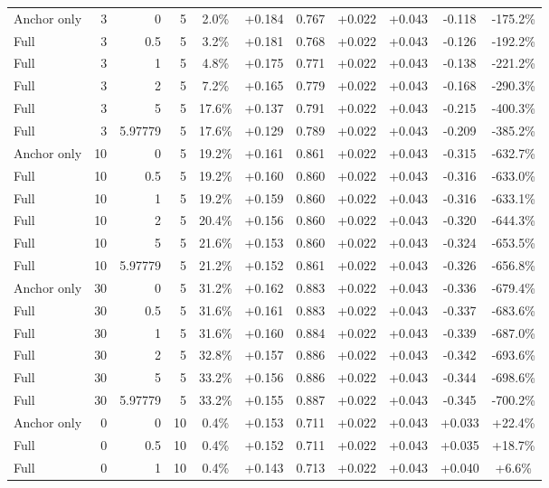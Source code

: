 \begin{table}[htbp]
\begin{tabular}{lrrrccccccc}
Anchor only & 3 & 0 & 5 & 2.0\% & +0.184 & 0.767 & +0.022 & +0.043 & -0.118 & -175.2\% \\
Full & 3 & 0.5 & 5 & 3.2\% & +0.181 & 0.768 & +0.022 & +0.043 & -0.126 & -192.2\% \\
Full & 3 & 1 & 5 & 4.8\% & +0.175 & 0.771 & +0.022 & +0.043 & -0.138 & -221.2\% \\
Full & 3 & 2 & 5 & 7.2\% & +0.165 & 0.779 & +0.022 & +0.043 & -0.168 & -290.3\% \\
Full & 3 & 5 & 5 & 17.6\% & +0.137 & 0.791 & +0.022 & +0.043 & -0.215 & -400.3\% \\
Full & 3 & 5.97779 & 5 & 17.6\% & +0.129 & 0.789 & +0.022 & +0.043 & -0.209 & -385.2\% \\
Anchor only & 10 & 0 & 5 & 19.2\% & +0.161 & 0.861 & +0.022 & +0.043 & -0.315 & -632.7\% \\
Full & 10 & 0.5 & 5 & 19.2\% & +0.160 & 0.860 & +0.022 & +0.043 & -0.316 & -633.0\% \\
Full & 10 & 1 & 5 & 19.2\% & +0.159 & 0.860 & +0.022 & +0.043 & -0.316 & -633.1\% \\
Full & 10 & 2 & 5 & 20.4\% & +0.156 & 0.860 & +0.022 & +0.043 & -0.320 & -644.3\% \\
Full & 10 & 5 & 5 & 21.6\% & +0.153 & 0.860 & +0.022 & +0.043 & -0.324 & -653.5\% \\
Full & 10 & 5.97779 & 5 & 21.2\% & +0.152 & 0.861 & +0.022 & +0.043 & -0.326 & -656.8\% \\
Anchor only & 30 & 0 & 5 & 31.2\% & +0.162 & 0.883 & +0.022 & +0.043 & -0.336 & -679.4\% \\
Full & 30 & 0.5 & 5 & 31.6\% & +0.161 & 0.883 & +0.022 & +0.043 & -0.337 & -683.6\% \\
Full & 30 & 1 & 5 & 31.6\% & +0.160 & 0.884 & +0.022 & +0.043 & -0.339 & -687.0\% \\
Full & 30 & 2 & 5 & 32.8\% & +0.157 & 0.886 & +0.022 & +0.043 & -0.342 & -693.6\% \\
Full & 30 & 5 & 5 & 33.2\% & +0.156 & 0.886 & +0.022 & +0.043 & -0.344 & -698.6\% \\
Full & 30 & 5.97779 & 5 & 33.2\% & +0.155 & 0.887 & +0.022 & +0.043 & -0.345 & -700.2\% \\
Anchor only & 0 & 0 & 10 & 0.4\% & +0.153 & 0.711 & +0.022 & +0.043 & +0.033 & +22.4\% \\
Full & 0 & 0.5 & 10 & 0.4\% & +0.152 & 0.711 & +0.022 & +0.043 & +0.035 & +18.7\% \\
Full & 0 & 1 & 10 & 0.4\% & +0.143 & 0.713 & +0.022 & +0.043 & +0.040 & +6.6\% \\

\end{tabular}
\end{table}
